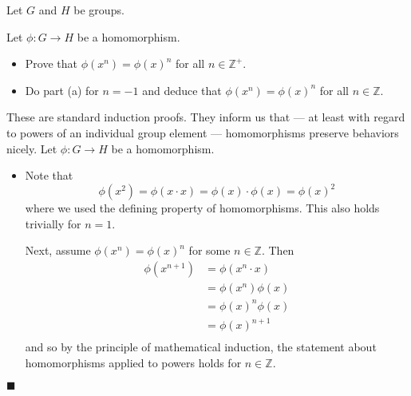 \documentclass[12pt]{article}
\renewcommand{\qed}{\hfill$\blacksquare$}
\renewenvironment{proof}{\begin{addmargin}[1em]{0em}\begin{newproof}}{\end{newproof}\end{addmargin}\qed}
\newenvironment{problem}[2][Exercise]{\begin{trivlist}
\item[\hskip \labelsep {\bfseries #1}\hskip \labelsep {\bfseries #2.}]}{\end{trivlist}}
\begin{document}
Let $G$ and $H$ be groups.\\
\begin{problem}{1.6.1}
Let $\phi:G\rightarrow H$ be a homomorphism.
\begin{itemize}
    \item Prove that $\phi\left(x^n\right)=\phi\left(x\right)^n$ for all $n\in \mathbb{Z}^+$.
    \item Do part (a) for $n=-1$ and deduce that $\phi\left(x^n\right)=\phi\left(x\right)^n$ for all $n\in \mathbb{Z}$.
\end{itemize}
\end{problem}
\begin{proof}
These are standard induction proofs. They inform us that --- at least with regard to powers of an individual group element --- homomorphisms preserve behaviors nicely. Let $\phi:G\rightarrow H$ be a homomorphism.
\begin{itemize}
    \item Note that $$ \phi\left(x^2\right)=\phi\left(x\cdot x\right)=\phi\left(x\right)\cdot \phi\left(x\right)=\phi\left(x\right)^2 $$ where we used the defining property of homomorphisms. This also holds trivially for $n=1$.

    Next, assume $\phi\left(x^n\right)=\phi\left(x\right)^n$ for some $n\in \mathbb{Z}$. Then
    \begin{equation*}
        \begin{split}
            \phi\left(x^{n+1}\right) & = \phi\left(x^n\cdot x\right) \\
            & = \phi\left(x^n\right)\phi\left(x\right) \\
            & = \phi\left(x\right)^n \phi\left(x\right) \\
            & = \phi\left(x\right)^{n+1}\\
        \end{split}
    \end{equation*}
    and so by the principle of mathematical induction, the statement about homomorphisms applied to powers holds for $n\in \mathbb{Z}$.


\end{itemize}
\end{proof}
\end{document}
